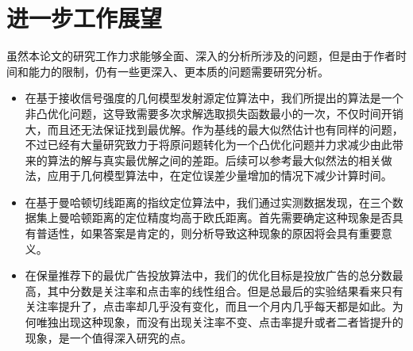 \section{进一步工作展望}

虽然本论文的研究工作力求能够全面、深入的分析所涉及的问题，但是由于作者时间和能力的限制，仍有一些更深入、更本质的问题需要研究分析。
\begin{itemize}
	\item 在基于接收信号强度的几何模型发射源定位算法中，我们所提出的算法是一个非凸优化问题，这导致需要多次求解选取损失函数最小的一次，不仅时间开销大，而且还无法保证找到最优解。作为基线的最大似然估计也有同样的问题，不过已经有大量研究致力于将原问题转化为一个凸优化问题并力求减少由此带来的算法的解与真实最优解之间的差距。后续可以参考最大似然法的相关做法，应用于几何模型算法中，在定位误差少量增加的情况下减少计算时间。
	
	\item 在基于曼哈顿切线距离的指纹定位算法中，我们通过实测数据发现，在三个数据集上曼哈顿距离的定位精度均高于欧氏距离。首先需要确定这种现象是否具有普适性，如果答案是肯定的，则分析导致这种现象的原因将会具有重要意义。
	
	\item 在保量推荐下的最优广告投放算法中，我们的优化目标是投放广告的总分数最高，其中分数是关注率和点击率的线性组合。但是总最后的实验结果看来只有关注率提升了，点击率却几乎没有变化，而且一个月内几乎每天都是如此。为何唯独出现这种现象，而没有出现关注率不变、点击率提升或者二者皆提升的现象，是一个值得深入研究的点。
\end{itemize}



